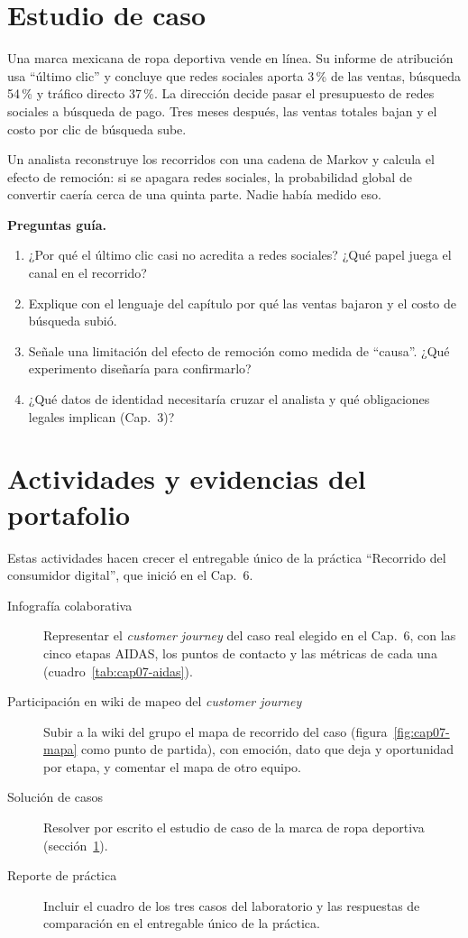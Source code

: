 \section{Estudio de caso}
\label{sec:cap07-caso}

\begin{casoFicticio}
Una marca mexicana de ropa deportiva vende en línea. Su informe de atribución
usa \enquote{último clic} y concluye que redes sociales aporta 3\,\% de las
ventas, búsqueda 54\,\% y tráfico directo 37\,\%. La dirección decide pasar el
presupuesto de redes sociales a búsqueda de pago. Tres meses después, las
ventas totales bajan y el costo por clic de búsqueda sube.

Un analista reconstruye los recorridos con una cadena de Markov y calcula el
efecto de remoción: si se apagara redes sociales, la probabilidad global de
convertir caería cerca de una quinta parte. Nadie había medido eso.

\textbf{Preguntas guía.}
\begin{enumerate}
  \item ¿Por qué el último clic casi no acredita a redes sociales? ¿Qué papel
  juega el canal en el recorrido?
  \item Explique con el lenguaje del capítulo por qué las ventas bajaron y el
  costo de búsqueda subió.
  \item Señale una limitación del efecto de remoción como medida de
  \enquote{causa}. ¿Qué experimento diseñaría para confirmarlo?
  \item ¿Qué datos de identidad necesitaría cruzar el analista y qué
  obligaciones legales implican (Cap.~3)?
\end{enumerate}
\end{casoFicticio}

\section{Actividades y evidencias del portafolio}

Estas actividades hacen crecer el entregable único de la práctica
\enquote{Recorrido del consumidor digital}, que inició en el Cap.~6.

\begin{description}
  \item[Infografía colaborativa] Representar el \textit{customer journey} del
  caso real elegido en el Cap.~6, con las cinco etapas AIDAS, los puntos de
  contacto y las métricas de cada una (cuadro~\ref{tab:cap07-aidas}).
  \item[Participación en wiki de mapeo del \textit{customer journey}] Subir a
  la wiki del grupo el mapa de recorrido del caso (figura~\ref{fig:cap07-mapa}
  como punto de partida), con emoción, dato que deja y oportunidad por etapa,
  y comentar el mapa de otro equipo.
  \item[Solución de casos] Resolver por escrito el estudio de caso de la marca
  de ropa deportiva (sección~\ref{sec:cap07-caso}).
  \item[Reporte de práctica] Incluir el cuadro de los tres casos del
  laboratorio y las respuestas de comparación en el entregable único de la
  práctica.
\end{description}

